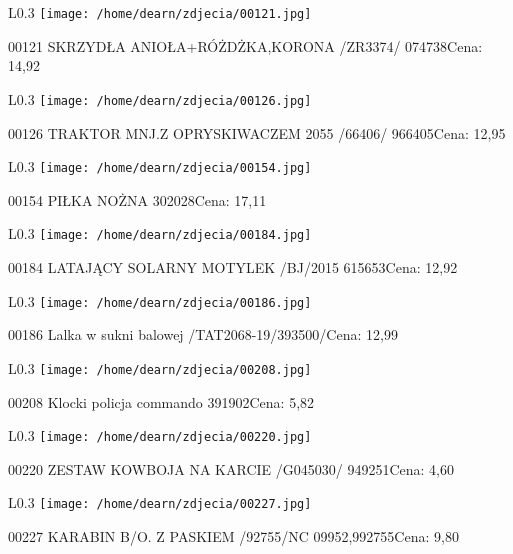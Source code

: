 \begin{wrapfigure}{L}{0.3\textwidth}
\texttt{[image: /home/dearn/zdjecia/00121.jpg]}
\end{wrapfigure}
00121 SKRZYDŁA ANIOŁA+RÓŻDŻKA,KORONA /ZR3374/         074738Cena: 14,92\newline
\begin{wrapfigure}{L}{0.3\textwidth}
\texttt{[image: /home/dearn/zdjecia/00126.jpg]}
\end{wrapfigure}
00126 TRAKTOR MNJ.Z OPRYSKIWACZEM 2055  /66406/       966405Cena: 12,95\newline
\begin{wrapfigure}{L}{0.3\textwidth}
\texttt{[image: /home/dearn/zdjecia/00154.jpg]}
\end{wrapfigure}
00154 PIŁKA NOŻNA 302028Cena: 17,11\newline
\begin{wrapfigure}{L}{0.3\textwidth}
\texttt{[image: /home/dearn/zdjecia/00184.jpg]}
\end{wrapfigure}
00184 LATAJĄCY SOLARNY MOTYLEK  /BJ/2015              615653Cena: 12,92\newline
\begin{wrapfigure}{L}{0.3\textwidth}
\texttt{[image: /home/dearn/zdjecia/00186.jpg]}
\end{wrapfigure}
00186 Lalka w sukni balowej /TAT2068-19/393500/Cena: 12,99\newline
\begin{wrapfigure}{L}{0.3\textwidth}
\texttt{[image: /home/dearn/zdjecia/00208.jpg]}
\end{wrapfigure}
00208 Klocki policja commando 391902Cena: 5,82\newline
\begin{wrapfigure}{L}{0.3\textwidth}
\texttt{[image: /home/dearn/zdjecia/00220.jpg]}
\end{wrapfigure}
00220 ZESTAW KOWBOJA NA KARCIE /G045030/              949251Cena: 4,60\newline
\begin{wrapfigure}{L}{0.3\textwidth}
\texttt{[image: /home/dearn/zdjecia/00227.jpg]}
\end{wrapfigure}
00227 KARABIN B/O. Z PASKIEM  /92755/NC         09952,992755Cena: 9,80\newline
